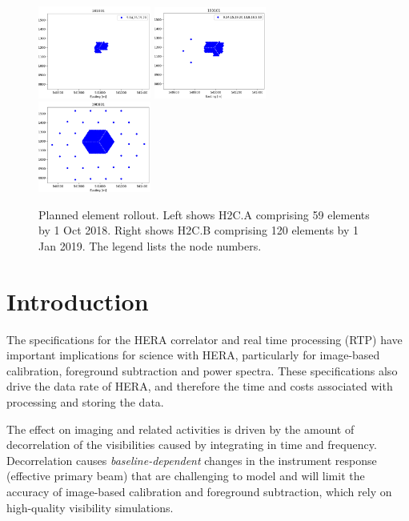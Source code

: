 \documentclass{article}
\begin{document}
\begin{figure}[H]
\includegraphics[width=0.33\textwidth]{cfg181001.png}
\includegraphics[width=0.33\textwidth]{cfg190101.png}
\includegraphics[width=0.33\textwidth]{ant_all.png}
\caption{Planned element rollout.  Left shows H2C.A comprising 59 elements by 1 Oct 2018.  Right shows H2C.B comprising 120 elements by 1 Jan 2019.  The legend lists the node numbers.}
\label{Fig:antennas}
\end{figure}

\newpage
\section*{Introduction}
The specifications for the HERA correlator and real time processing (RTP) have important implications for science with HERA, 
particularly for image-based calibration, foreground subtraction and power spectra. 
These specifications also drive the data rate of HERA, and therefore the time and costs associated with processing and storing the data.

The effect on imaging and related activities is driven by the amount of decorrelation of the visibilities caused by integrating in time and frequency. 
Decorrelation causes \textit{baseline-dependent} changes in the instrument response (effective primary beam) that are challenging to model and will 
limit the accuracy of image-based calibration and foreground subtraction, which rely on high-quality visibility simulations. 
\end{document}
